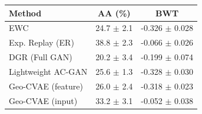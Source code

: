 \begin{tabular}{lcc}
\toprule
\textbf{Method} & \textbf{AA (\%)} & \textbf{BWT} \\
\midrule
EWC & 24.7 $\pm$ 2.1 & -0.326 $\pm$ 0.028 \\
Exp. Replay (ER) & 38.8 $\pm$ 2.3 & -0.066 $\pm$ 0.026 \\
DGR (Full GAN) & 20.2 $\pm$ 3.4 & -0.199 $\pm$ 0.074 \\
Lightweight AC-GAN & 25.6 $\pm$ 1.3 & -0.328 $\pm$ 0.030 \\
Geo-CVAE (feature) & 26.0 $\pm$ 2.4 & -0.318 $\pm$ 0.023 \\
Geo-CVAE (input) & 33.2 $\pm$ 3.1 & -0.052 $\pm$ 0.038 \\
\bottomrule
\end{tabular}
